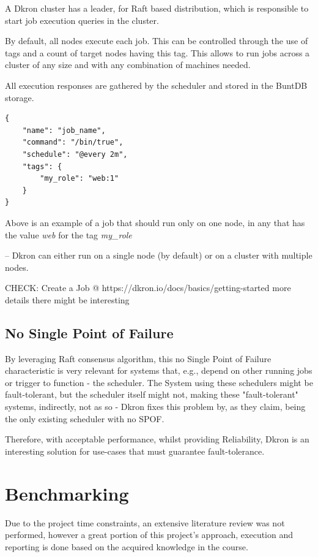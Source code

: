 \documentclass[runningheads]{llncs}
\begin{document}
A Dkron cluster has a leader, for Raft based distribution, which is responsible to start job execution queries in the cluster.

By default, all nodes execute each job. This can be controlled through the use of tags and
a count of target nodes having this tag. This allows to run jobs across a cluster of any size and with any
combination of machines needed.

All execution responses are gathered by the scheduler and stored in the BuntDB storage.

\begin{verbatim}
{
    "name": "job_name",
    "command": "/bin/true",
    "schedule": "@every 2m",
    "tags": {
        "my_role": "web:1"
    }
}
\end{verbatim}

Above is an example of a job that should run only on one node, in any that has the value \textit{web}
for the tag \textit{my\_role}




--
Dkron can either run on a single node (by default) or on a cluster with multiple nodes.

CHECK: Create a Job @ https://dkron.io/docs/basics/getting-started more details there might be interesting



\subsection{No Single Point of Failure}
By leveraging Raft consensus algorithm, this no Single Point of Failure characteristic is very relevant for systems
that, e.g., depend on other running jobs or trigger to function - the scheduler.
The System using these schedulers might be fault-tolerant, but the scheduler itself might not, making these "fault-tolerant" systems, indirectly, not as
so - Dkron fixes this problem by, as they claim, being the only existing scheduler with no SPOF.

Therefore, with acceptable performance, whilst providing Reliability, Dkron is an interesting solution
for use-cases that must guarantee fault-tolerance.

\section{Benchmarking}

Due to the project time constraints, an extensive literature review was not performed, however
a great portion of this project's approach, execution and reporting is done based on the acquired
knowledge in the course.
\end{document}
